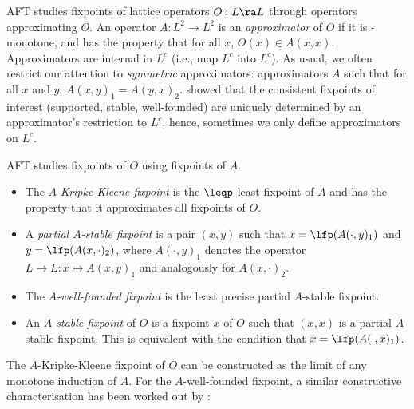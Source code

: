 

AFT studies fixpoints of lattice operators $O:L\ra L$ through operators approximating $O$.
 An operator $A: L^2\to L^2$  is an \emph{approximator} of $O$ if it is \leqp-monotone,  and has the property that for all $x$, $O(x)\in A(x,x)$. %
Approximators are
internal in $L^c$ (i.e., map $L^c$ into $L^c$).
As usual, we often restrict our attention to \emph{symmetric} approximators: approximators $A$ such that for all $x$ and $y$, $A(x,y)_1 = A(y,x)_2$. %
\cite{DeneckerMT04} showed that the consistent fixpoints of interest (supported, stable, well-founded) are uniquely determined by an approximator's restriction to $L^c$, hence, sometimes we only define approximators on $L^c$. 

AFT studies fixpoints of $O$ using fixpoints of $A$. 
 \begin{itemize}
  \item The \emph{$A$-Kripke-Kleene fixpoint} is the $\leqp$-least fixpoint of $A$ and has the property that it approximates all fixpoints of $O$. 
\item A \emph{partial $A$-stable fixpoint} is a pair  $(x,y)$ such that $x=\lfp(A(\cdot,y)_1)$ and $y=\lfp(A(x,\cdot)_2)$, where $A(\cdot,y)_1$ denotes the operator $L\to L:x\mapsto A(x,y)_1$ and analogously for $A(x,\cdot)_2$. 
\item The \emph{$A$-well-founded fixpoint} is the least precise partial $A$-stable fixpoint. 
\item  An \emph{$A$-stable fixpoint} of $O$ is a fixpoint $x$ of $O$ such that $(x,x)$ is a partial $A$-stable fixpoint. This is equivalent with the condition that $x=\lfp(A(\cdot, x)_1)$.  
 \end{itemize}

% 
% 
The $A$-Kripke-Kleene fixpoint of $O$ can be constructed as the limit of any monotone induction of $A$. 
For the $A$-well-founded fixpoint, a similar constructive characterisation has been worked out by \citet{lpnmr/DeneckerV07}:
 

